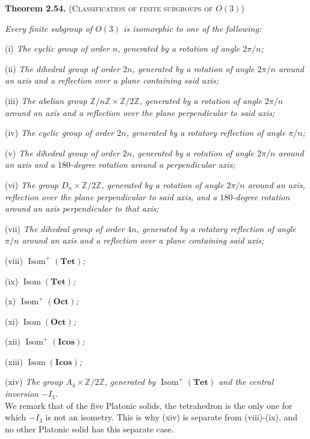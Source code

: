 \documentclass[leqno]{book}
\begin{document}
\noindent\textbf{Theorem 2.54.} \textsc{(Classification of finite subgroups of $O(3)$)}

\emph{Every finite subgroup of $O(3)$ is isomorphic to one of the following:}

(i) \emph{The cyclic group of order $n$, generated by a rotation of angle $2\pi/n$;}

(ii) \emph{The dihedral group of order $2n$, generated by a rotation of angle $2\pi/n$ around an axis and a reflection over a plane containing said axis;}

(iii) \emph{The abelian group $\mathbb Z/n\mathbb Z\times\mathbb Z/2\mathbb Z$, generated by a rotation of angle $2\pi/n$ around an axis and a reflection over the plane perpendicular to said axis;}

(iv) \emph{The cyclic group of order $2n$, generated by a rotatory reflection of angle $\pi/n$;}

(v) \emph{The dihedral group of order $2n$, generated by a rotation of angle $2\pi/n$ around an axis and a $180$-degree rotation around a perpendicular axis;}

(vi) \emph{The group $D_n\times\mathbb Z/2\mathbb Z$, generated by a rotation of angle $2\pi/n$ around an axis, reflection over the plane perpendicular to said axis, and a $180$-degree rotation around an axis perpendicular to that axis;}

(vii) \emph{The dihedral group of order $4n$, generated by a rotatory reflection of angle $\pi/n$ around an axis and a reflection over a plane containing said axis;}

(viii) \emph{$\operatorname{Isom}^+(\mathbf{Tet})$;}

(ix) \emph{$\operatorname{Isom}(\mathbf{Tet})$;}

(x) \emph{$\operatorname{Isom}^+(\mathbf{Oct})$;}

(xi) \emph{$\operatorname{Isom}(\mathbf{Oct})$;}

(xii) \emph{$\operatorname{Isom}^+(\mathbf{Icos})$;}

(xiii) \emph{$\operatorname{Isom}(\mathbf{Icos})$;}

(xiv) \emph{The group $A_4\times\mathbb Z/2\mathbb Z$, generated by $\operatorname{Isom}^+(\mathbf{Tet})$ and the central inversion $-I_3$.}\\

\noindent We remark that of the five Platonic solids, the tetrahedron is the only one for which $-I_3$ is not an isometry.  This is why (xiv) is separate from (viii)-(ix), and no other Platonic solid has this separate case.
\end{document}
